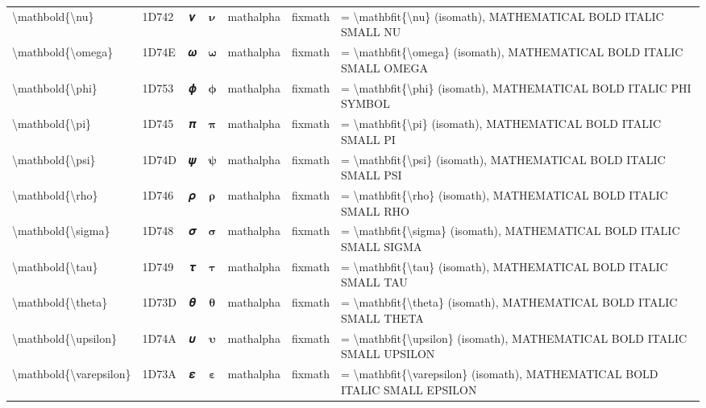 \documentclass[a4paper,landscape]{article}
\begin{document}
\begin{longtable}{llcclll}
\textbackslash{}mathbold\{\textbackslash{}nu\} & 1D742 & 𝝂 & $\mathbold{\nu}$ & mathalpha & fixmath & = \textbackslash{}mathbfit\{\textbackslash{}nu\} (isomath),  MATHEMATICAL BOLD ITALIC SMALL NU \\
\textbackslash{}mathbold\{\textbackslash{}omega\} & 1D74E & 𝝎 & $\mathbold{\omega}$ & mathalpha & fixmath & = \textbackslash{}mathbfit\{\textbackslash{}omega\} (isomath),  MATHEMATICAL BOLD ITALIC SMALL OMEGA \\
\textbackslash{}mathbold\{\textbackslash{}phi\} & 1D753 & 𝝓 & $\mathbold{\phi}$ & mathalpha & fixmath & = \textbackslash{}mathbfit\{\textbackslash{}phi\} (isomath),  MATHEMATICAL BOLD ITALIC PHI SYMBOL \\
\textbackslash{}mathbold\{\textbackslash{}pi\} & 1D745 & 𝝅 & $\mathbold{\pi}$ & mathalpha & fixmath & = \textbackslash{}mathbfit\{\textbackslash{}pi\} (isomath),  MATHEMATICAL BOLD ITALIC SMALL PI \\
\textbackslash{}mathbold\{\textbackslash{}psi\} & 1D74D & 𝝍 & $\mathbold{\psi}$ & mathalpha & fixmath & = \textbackslash{}mathbfit\{\textbackslash{}psi\} (isomath),  MATHEMATICAL BOLD ITALIC SMALL PSI \\
\textbackslash{}mathbold\{\textbackslash{}rho\} & 1D746 & 𝝆 & $\mathbold{\rho}$ & mathalpha & fixmath & = \textbackslash{}mathbfit\{\textbackslash{}rho\} (isomath),  MATHEMATICAL BOLD ITALIC SMALL RHO \\
\textbackslash{}mathbold\{\textbackslash{}sigma\} & 1D748 & 𝝈 & $\mathbold{\sigma}$ & mathalpha & fixmath & = \textbackslash{}mathbfit\{\textbackslash{}sigma\} (isomath),  MATHEMATICAL BOLD ITALIC SMALL SIGMA \\
\textbackslash{}mathbold\{\textbackslash{}tau\} & 1D749 & 𝝉 & $\mathbold{\tau}$ & mathalpha & fixmath & = \textbackslash{}mathbfit\{\textbackslash{}tau\} (isomath),  MATHEMATICAL BOLD ITALIC SMALL TAU \\
\textbackslash{}mathbold\{\textbackslash{}theta\} & 1D73D & 𝜽 & $\mathbold{\theta}$ & mathalpha & fixmath & = \textbackslash{}mathbfit\{\textbackslash{}theta\} (isomath),  MATHEMATICAL BOLD ITALIC SMALL THETA \\
\textbackslash{}mathbold\{\textbackslash{}upsilon\} & 1D74A & 𝝊 & $\mathbold{\upsilon}$ & mathalpha & fixmath & = \textbackslash{}mathbfit\{\textbackslash{}upsilon\} (isomath),  MATHEMATICAL BOLD ITALIC SMALL UPSILON \\
\textbackslash{}mathbold\{\textbackslash{}varepsilon\} & 1D73A & 𝜺 & $\mathbold{\varepsilon}$ & mathalpha & fixmath & = \textbackslash{}mathbfit\{\textbackslash{}varepsilon\} (isomath),  MATHEMATICAL BOLD ITALIC SMALL EPSILON \\

\end{longtable}
\end{document}
